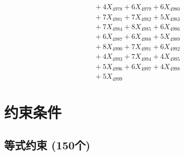 \documentclass[a4paper,10pt]{article}
\begin{document}
{\begin{align}
&\;  + 4 X_{4978} + 6 X_{4979} + 6 X_{4980} \\[0.3ex]
&\;  + 7 X_{4981} + 7 X_{4982} + 5 X_{4983} \\[0.3ex]
&\;  + 7 X_{4984} + 8 X_{4985} + 6 X_{4986} \\[0.3ex]
&\;  + 6 X_{4987} + 6 X_{4988} + 5 X_{4989} \\[0.5ex]\allowbreak
&\;  + 8 X_{4990} + 7 X_{4991} + 6 X_{4992} \\[0.3ex]
&\;  + 4 X_{4993} + 7 X_{4994} + 4 X_{4995} \\[0.3ex]
&\;  + 5 X_{4996} + 6 X_{4997} + 4 X_{4998} \\[0.3ex]
&\;  + 5 X_{4999}\nonumber
\end{align}
}

\section{约束条件}

\subsection{等式约束 (150个)}
\end{document}
